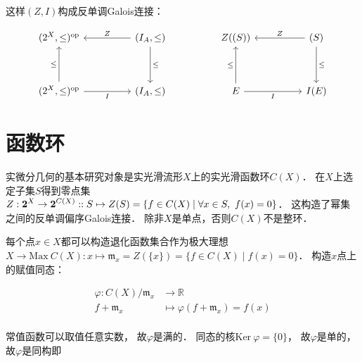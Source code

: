 这样$(Z,I)$构成反单调Galois连接：

$$
\begin{tikzcd}
{(\text 2^X,\leq)^\text{op}}                                     &  & {(I_A,\leq)} \arrow[dd, "\leq"] \arrow[ll, "Z"'] &  & Z((S))                                &  & (S) \arrow[ll, "Z"'] \arrow[dd, "\leq"] \\
                                                                 &  &                                                  &  &                                       &  &                                         \\
{(\text 2^X,\leq)^\text{op}} \arrow[uu, "\leq"] \arrow[rr, "I"'] &  & {(I_A,\leq)}                                     &  & E \arrow[uu, "\leq"] \arrow[rr, "I"'] &  & I(E)                                   
\end{tikzcd}
$$

\section{函数环}

实微分几何的基本研究对象是实光滑流形$X$上的实光滑函数环$C(X)$．
在$X$上选定子集$S$得到零点集 
$Z: \textbf 2^X \to \textbf 2^{C(X)} :: S \mapsto Z(S) = \{ f \in C(X) \mid \forall x \in S,\ f(x) = 0 \}$．
这构造了幂集之间的反单调偏序Galois连接．
除非$X$是单点，否则$C(X)$不是整环．
    
每个点$x \in X$都可以构造退化函数集合作为极大理想
$X \to \text{Max} \ C(X) : x \mapsto \mathfrak m_x = Z(\{ x \}) = \{ f \in C(X) \mid f(x) = 0 \}$．
构造$x$点上的赋值同态：

$$
\begin{aligned}
\varphi: C(X)/\mathfrak m_x &\to \mathbb R \\
f + \mathfrak m_x &\mapsto \varphi(f + \mathfrak m_x) = f(x) \\
\end{aligned}
$$

常值函数可以取值任意实数，
故$\varphi$是满的．
同态的核$\text{Ker} \ \varphi = \{ 0 \}$，
故$\varphi$是单的，
故$\varphi$是同构即

